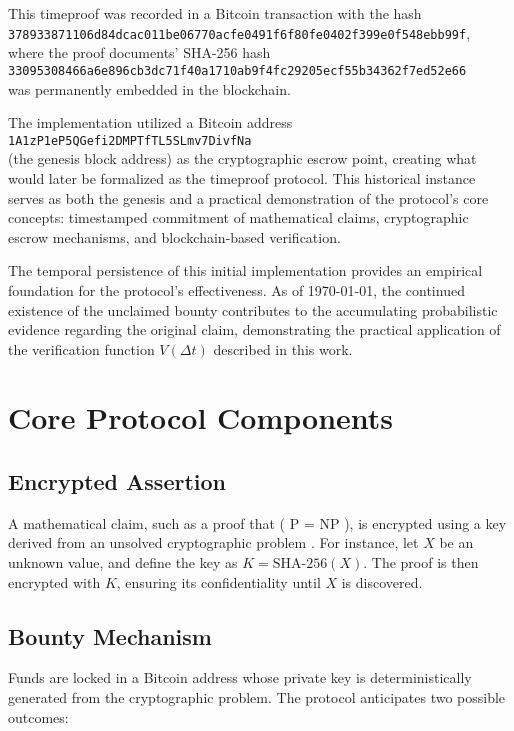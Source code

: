 \documentclass[12pt]{report}
\begin{document}
This timeproof was recorded in a Bitcoin transaction with the hash\\
\texttt{378933871106d84dcac011be06770acfe0491f6f80fe0402f399e0f548ebb99f},\\
where the proof documents' SHA-256 hash\\
\texttt{33095308466a6e896cb3dc71f40a1710ab9f4fc29205ecf55b34362f7ed52e66}\\
was permanently embedded in the blockchain.

The implementation utilized a Bitcoin address\\
\texttt{1A1zP1eP5QGefi2DMPTfTL5SLmv7DivfNa}\\
(the genesis block address) as the cryptographic escrow point, creating what would later be formalized as the timeproof protocol. This historical instance serves as both the genesis and a practical demonstration of the protocol's core concepts: timestamped commitment of mathematical claims, cryptographic escrow mechanisms, and blockchain-based verification.

The temporal persistence of this initial implementation provides an empirical foundation for the protocol's effectiveness. As of \today, the continued existence of the unclaimed bounty contributes to the accumulating probabilistic evidence regarding the original claim, demonstrating the practical application of the verification function \( V(\Delta t) \) described in this work.

\section{Core Protocol Components}
\subsection{Encrypted Assertion}

A mathematical claim, such as a proof that ( P = NP ), is encrypted using a key derived from an unsolved cryptographic problem \cite{DiffieHellman1976}. For instance, let \( X \) be an unknown value, and define the key as \( K = \text{SHA-256}(X) \). The proof is then encrypted with \( K \), ensuring its confidentiality until \( X \) is discovered.

\subsection{Bounty Mechanism}

Funds are locked in a Bitcoin address whose private key is deterministically generated from the cryptographic problem. The protocol anticipates two possible outcomes:
\end{document}
